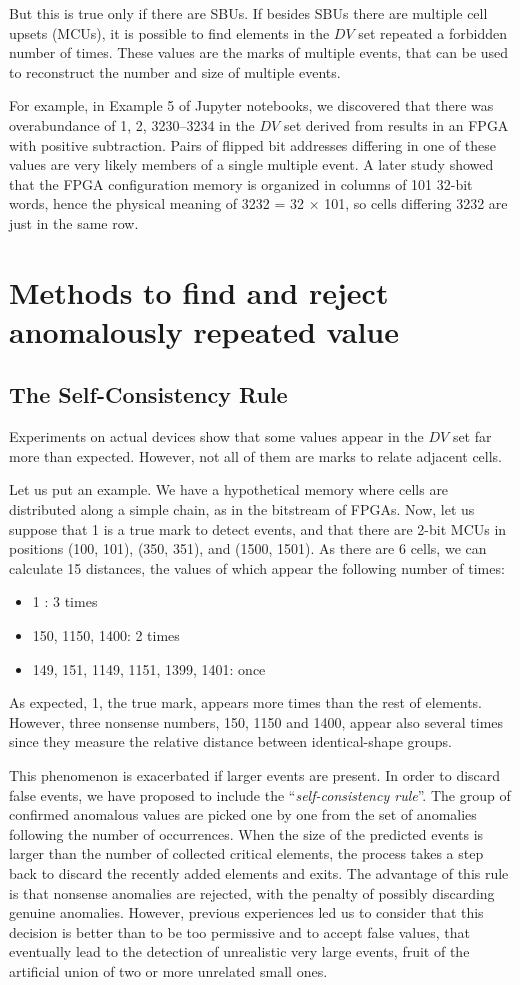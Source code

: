 But this is true only if there are SBUs. If besides SBUs there are multiple cell upsets (MCUs), it is possible to find elements in the \(DV\) set repeated a forbidden number of times. These values are the marks of multiple events, that can be used to reconstruct the number and size of multiple events.

For example, in Example 5 of Jupyter notebooks, we discovered that there was overabundance of 1, 2, 3230--3234 in the \(DV\) set derived from results in an FPGA with positive subtraction. Pairs of flipped bit addresses differing in one of these values are very likely members of a single multiple event. A later study showed that the FPGA configuration memory is organized in columns of 101 32-bit words, hence the physical meaning of 3232 = 32 $\times$ 101, so cells differing 3232 are just in the same row.
%
\section{Methods to find and reject anomalously repeated value}
%
\subsection{The Self-Consistency Rule}
Experiments on actual devices show that some values appear in the \(DV\) set far more than expected. However, not all of them are marks to relate adjacent cells. 

Let us put an example. We have a hypothetical memory where cells are distributed along a simple chain, as in the bitstream of FPGAs. Now, let us suppose that 1 is a true mark to detect events, and that there are 2-bit MCUs in positions (100, 101), (350, 351), and (1500, 1501). As there are 6 cells, we can calculate 15 distances, the values of which appear the following number of times:
%
\begin{itemize}
	\item 1 : 3 times
	\item 150, 1150, 1400: 2 times
	\item 149, 151, 1149, 1151, 1399, 1401: once
\end{itemize}
%
As expected, 1, the true mark, appears more times than the rest of elements. However, three nonsense numbers, 150, 1150 and 1400, appear also several times since they measure the relative distance between identical-shape groups.

This phenomenon is exacerbated if larger events are present. In order to discard false events, we have proposed to include the ``\textit{self-consistency rule}''. The group of confirmed anomalous values are picked one by one from the set of anomalies following the number of occurrences. When the size of the predicted events is larger than the number of collected critical elements, the process takes a step back to discard the recently added elements and exits. The advantage of this rule is that nonsense anomalies are rejected, with the penalty of possibly discarding genuine anomalies. However, previous experiences led us to consider that this decision is better than to be too permissive and to accept false values, that eventually lead to the detection of unrealistic very large events, fruit of the artificial union of two or more unrelated small ones.
%
